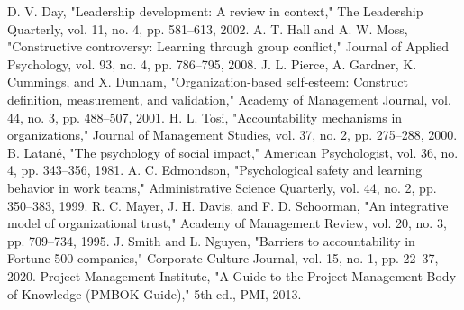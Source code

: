 \documentclass[11pt,a4paper]{article}
\begin{document}
\begin{thebibliography}{10}
 D. V. Day, "Leadership development: A review in context," The Leadership Quarterly, vol. 11, no. 4, pp. 581–613, 2002.
 A. T. Hall and A. W. Moss, "Constructive controversy: Learning through group conflict," Journal of Applied Psychology, vol. 93, no. 4, pp. 786–795, 2008.
 J. L. Pierce, A. Gardner, K. Cummings, and X. Dunham, "Organization-based self-esteem: Construct definition, measurement, and validation," Academy of Management Journal, vol. 44, no. 3, pp. 488–507, 2001.
 H. L. Tosi, "Accountability mechanisms in organizations," Journal of Management Studies, vol. 37, no. 2, pp. 275–288, 2000.
 B. Latané, "The psychology of social impact," American Psychologist, vol. 36, no. 4, pp. 343–356, 1981.
 A. C. Edmondson, "Psychological safety and learning behavior in work teams," Administrative Science Quarterly, vol. 44, no. 2, pp. 350–383, 1999.
 R. C. Mayer, J. H. Davis, and F. D. Schoorman, "An integrative model of organizational trust," Academy of Management Review, vol. 20, no. 3, pp. 709–734, 1995.
 J. Smith and L. Nguyen, "Barriers to accountability in Fortune 500 companies," Corporate Culture Journal, vol. 15, no. 1, pp. 22–37, 2020.
 Project Management Institute, "A Guide to the Project Management Body of Knowledge (PMBOK Guide)," 5th ed., PMI, 2013.
\end{thebibliography}
\end{document}
